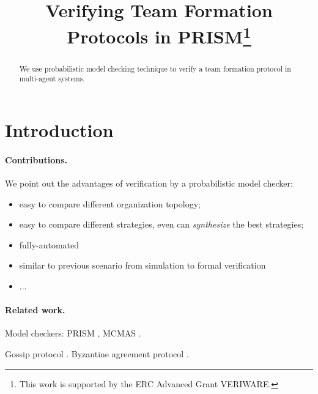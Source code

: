 \documentclass{llncs}
\begin{document}
\title{Verifying Team Formation Protocols in PRISM\thanks{This work is supported by
the ERC Advanced Grant VERIWARE.}}
\author{}
\email{}

\maketitle

\begin{abstract}
We use probabilistic model checking technique to verify a team formation protocol in multi-agent systems.

\end{abstract}

\section{Introduction}

\paragraph{Contributions.}

We point out the advantages of verification by a probabilistic model checker:

\begin{itemize}
  \item easy to compare different organization topology;

  \item easy to compare different strategies, even can \emph{synthesize} the best strategies;

  \item fully-automated

  \item similar to previous scenario from simulation to formal verification

  \item ...
\end{itemize}

\paragraph{Related work.}

Model checkers: PRISM \cite{KNP11}, MCMAS \cite{lomuscio2006mcmas}.

Gossip protocol \cite{KNP08d}. Byzantine agreement protocol \cite{KN02}.
\end{document}
